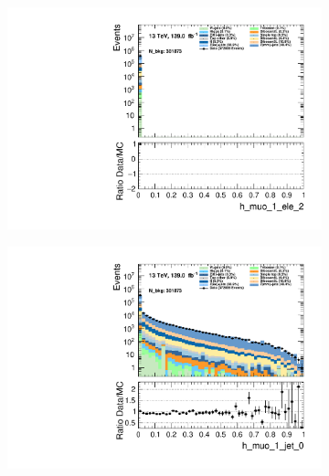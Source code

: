 \begin{figure}
    \centering
    \begin{subfigure}{.49\textwidth}
        \includegraphics[width=\textwidth]{Figures/MC_Data_comp/h_muo_1_ele_2.pdf}
        \caption{}
        \label{fig:et}
    \end{subfigure}
    \hfill
    \begin{subfigure}{.49\textwidth}
        \includegraphics[width=\textwidth]{Figures/MC_Data_comp/h_muo_1_jet_0.pdf}
        \caption{ }
        \label{fig:flcp}
    \end{subfigure}
    \hfill 
    \begin{subfigure}{.49\textwidth}

\end{subfigure}
\end{figure}
